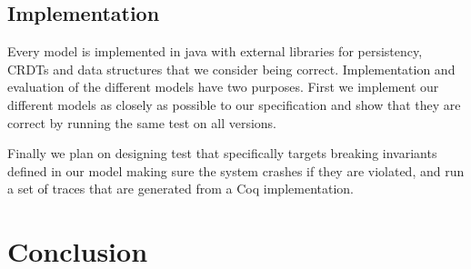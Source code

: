\documentclass[systeme]{compas2022}
\begin{document}



\subsection{Implementation}

Every model is implemented in java with external libraries for persistency, CRDTs and data structures that we consider being correct.
Implementation and evaluation of the different models have two purposes.
First we implement our different models as closely as possible to our specification and show that they are correct by running the same test on all versions.

Finally we plan on designing test that specifically targets breaking invariants defined in our model making sure the system crashes if they are violated, and run a set of traces that are generated from a Coq implementation.



\section{Conclusion}



\end{document}
